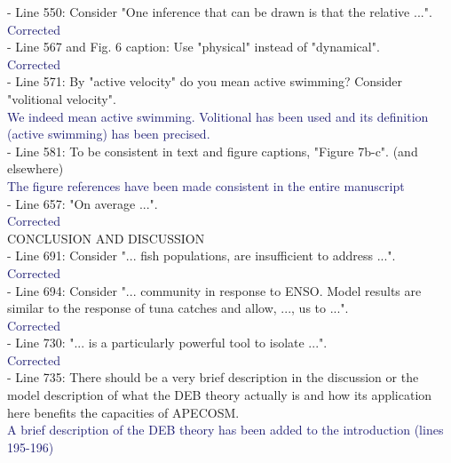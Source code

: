 \documentclass[12pt]{article}
\newcommand{\resp}[1]{\textcolor{MidnightBlue}{#1}}
\begin{document}
- Line 550: Consider "One inference that can be drawn is that the relative ...".\\

\resp{Corrected} \\

- Line 567 and Fig. 6 caption: Use "physical" instead of "dynamical".\\

\resp{Corrected} \\

- Line 571: By "active velocity" do you mean active swimming? Consider "volitional velocity".\\

\resp{We indeed mean active swimming. Volitional has been used and its definition (active swimming) has been precised.} \\

- Line 581: To be consistent in text and figure captions, "Figure 7b-c". (and elsewhere)\\

\resp{The figure references have been made consistent in the entire manuscript} \\

- Line 657: "On average ...".\\

\resp{Corrected} \\

CONCLUSION AND DISCUSSION\\

- Line 691: Consider "... fish populations, are insufficient to address ...".\\

\resp{Corrected}  \\

- Line 694: Consider "... community in response to ENSO. Model results are similar to the response of tuna catches and allow, ..., us to ...".\\

\resp{Corrected} \\

- Line 730: "... is a particularly powerful tool to isolate ...".\\

\resp{Corrected} \\

- Line 735: There should be a very brief description in the discussion or the model description of what the DEB theory actually is and how its application here benefits the capacities of APECOSM.\\

\resp{A brief description of the DEB theory has been added to the introduction (lines 195-196)}


\end{document}
